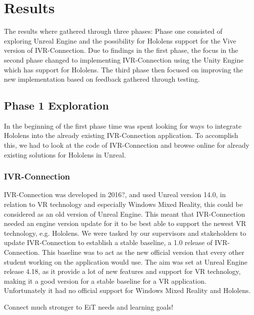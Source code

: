 \chapter{Results}
 The results where gathered through three phases: Phase one consisted of exploring Unreal Engine and the possibility for Hololens support for the Vive version of IVR-Connection. Due to findings in the first phase, the focus in the second phase changed to implementing IVR-Connection using the Unity Engine which has support for Hololens. The third phase then focused on improving the new implementation based on feedback gathered through testing.
 
    \section{Phase 1 Exploration}
    In the beginning of the first phase time was spent looking for ways to integrate Hololens into the already existing IVR-Connection application. To accomplish this, we had to look at the code of IVR-Connection and browse online for already existing solutions for Hololens in Unreal.
    
        \subsection{IVR-Connection}
        IVR-Connection was developed in 2016?, and used Unreal version 14.0, in relation to VR technology and especially Windows Mixed Reality, this could be considered as an old version of Unreal Engine. This meant that IVR-Connection needed an engine version update for it to be best able to support the newest VR technology, e.g. Hololens. We were tasked by our supervisors and stakeholders to update IVR-Connection to establish a stable baseline, a 1.0 release of IVR-Connection. This baseline was to act as the new official version that every other student working on the application would use. The aim was set at Unreal Engine release 4.18, as it provide a lot of new features and support for VR technology, making it a good version for a stable baseline for a VR application. Unfortunately it had no official support for Windows Mixed Reality and Hololens.
        
        Connect much stronger to EiT needs and learning goals!
        

